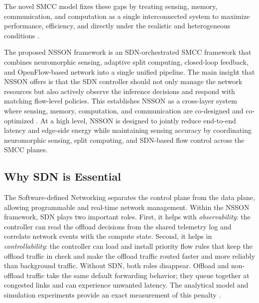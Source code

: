 \documentclass[journal]{IEEEtran}
\newcommand{\revblue}[1]{\textcolor{revblue}{#1}}
\begin{document}
The novel SMCC model fixes these gaps by treating sensing, memory, communication, and computation as a single interconnected system to maximize performance, efficiency, and directly under the realistic and heterogeneous conditions \cite{10812728,9453402,xie2023edge,chiang2023management}.

The proposed NSSON framework is an SDN-orchestrated SMCC framework that combines neuromorphic sensing, adaptive split computing, closed-loop feedback, and OpenFlow-based network into a single unified pipeline. The main insight that NSSON offers is that the SDN controller should not only manage the network resources but also actively observe the inference decisions and respond with matching flow-level policies. This establishes NSSON as a cross-layer system where sensing, memory, computation, and communication are co-designed and co-optimized \cite{zeb2023toward,fan2025latency,zhu2023pushing}. At a high level, NSSON is designed to jointly reduce end-to-end latency and edge-side energy while maintaining sensing accuracy by coordinating neuromorphic sensing, split computing, and SDN-based flow control across the SMCC planes.


\subsection{Why SDN is Essential}

The Software-defined Networking separates the control plane from the data plane, allowing programmable and real-time network management. Within the NSSON framework, SDN plays two important roles. First, it helps with \textit{observability}: the controller can read the offload decisions from the shared telemetry log and correlate network events with the compute state. Second, it helps in \textit{controllability}: the controller can load and install priority flow rules that keep the offload traffic in check and make the offload traffic routed faster and more reliably than background traffic. Without SDN, both roles disappear. Offload and non-offload traffic take the same default forwarding behavior; they queue together at congested links and can experience unwanted latency. The analytical model and simulation experiments provide an exact measurement of this penalty \cite{kreutz2014software,mckeown2008openflow,gude2008nox,siddiqui2022toward,jazaeri2021edge,lo2023sdn,ray2025internet}.
\end{document}
